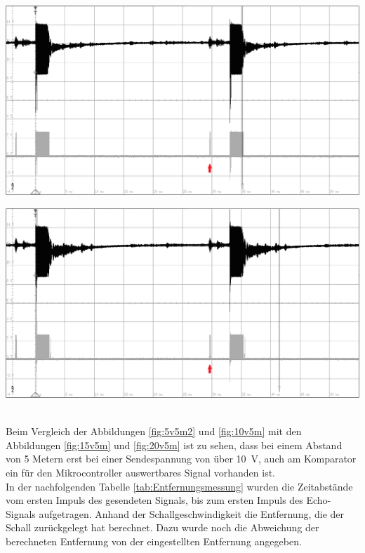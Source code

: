 \begin{minipage}{0.46\textwidth}
\includegraphics[width=1\textwidth%
]{Abbildungen/MessungenP2/15V/5mb.PNG}
\label{fig:15v5m}
\end{minipage}\qquad
\begin{minipage}{0.46\textwidth}
\includegraphics[width=1\textwidth%
]{Abbildungen/MessungenP2/20V/5mb.PNG}
\label{fig:20v5m}
\end{minipage}\\
Beim Vergleich der Abbildungen \ref{fig:5v5m2} und \ref{fig:10v5m} mit den Abbildungen \ref{fig:15v5m} und \ref{fig:20v5m}  ist zu sehen, dass bei einem Abstand von 5 Metern erst bei einer Sendespannung von über 10~V, auch am Komparator ein für den Mikrocontroller auswertbares Signal vorhanden ist. \\
In der nachfolgenden Tabelle \ref{tab:Entfernungsmessung} wurden die Zeitabstände vom ersten Impuls des gesendeten Signals, bis zum ersten Impuls des Echo-Signals aufgetragen. Anhand der Schallgeschwindigkeit die Entfernung, die der Schall zurückgelegt hat berechnet. Dazu wurde noch die Abweichung der berechneten Entfernung von der eingestellten Entfernung angegeben.\\


